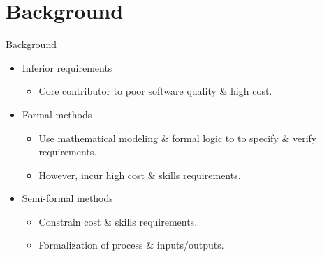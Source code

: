 \section{Background}

\begin{frame}{Background}
  \begin{itemize} 
    \item<+-| alert@+> Inferior requirements
      \begin{itemize}
      \item Core contributor to poor software quality \& high cost.
      \end{itemize}
    \item<+-| alert@+> Formal methods
      \begin{itemize}
      \item Use mathematical modeling \& formal logic to to specify \& verify requirements.
      \item However, incur high cost \& skills requirements.
      \end{itemize}
    \item<+-| alert@+> Semi-formal methods
      \begin{itemize}
	\item Constrain cost \& skills requirements.
	\item Formalization of process \& inputs/outputs.
    
      \end{itemize}
  \end{itemize}
\end{frame}

